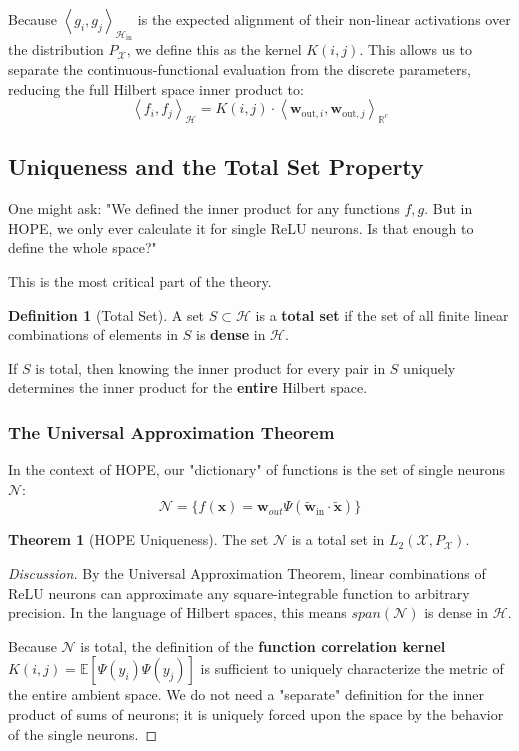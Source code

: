 \documentclass[11pt, a4paper, copyright, gdm]{google}
\newcommand{\inner}[2]{\left\langle#1, #2\right\rangle}
\newcommand{\wVect}{\boldsymbol{w}}
\newcommand{\xVect}{\boldsymbol{x}}
\newcommand{\calH}{\mathcal{H}}
\newcommand{\calN}{\mathcal{N}}
\newcommand{\calX}{\mathcal{X}}
\newcommand{\R}{\mathbb{R}}
\newcommand{\E}{\mathbb{E}}
\theoremstyle{definition}
\newtheorem{definition}{Definition}[section]
\newtheorem{theorem}{Theorem}[section]
\begin{document}
Because $\inner{g_i}{g_j}_{\calH_{\text{in}}}$ is the expected alignment of their non-linear activations over the distribution $P_{\calX}$, we define this as the kernel $K(i,j)$. This allows us to separate the continuous-functional evaluation from the discrete parameters, reducing the full Hilbert space inner product to:
\begin{equation}
    \inner{f_i}{f_j}_{\calH} = K(i,j) \cdot \inner{\wVect_{\text{out},i}}{\wVect_{\text{out},j}}_{\R^c}
\end{equation}

\subsection{Uniqueness and the Total Set Property}

One might ask: "We defined the inner product for any functions $f, g$. But in HOPE, we only ever calculate it for single ReLU neurons. Is that enough to define the whole space?"

This is the most critical part of the theory.

\begin{definition}[Total Set]
A set $S \subset \calH$ is a \textbf{total set} if the set of all finite linear combinations of elements in $S$ is \textbf{dense} in $\calH$.
\end{definition}

If $S$ is total, then knowing the inner product for every pair in $S$ uniquely determines the inner product for the \textbf{entire} Hilbert space. 

\subsubsection{The Universal Approximation Theorem}

In the context of HOPE, our "dictionary" of functions is the set of single neurons $\calN$:
\begin{equation}
    \calN = \{ f(\xVect) = \wVect_{out} \Psi(\tilde{\wVect}_{\text{in}} \cdot \tilde{\xVect}) \}
\end{equation}

\begin{theorem}[HOPE Uniqueness]
The set $\calN$ is a total set in $L_2(\calX, P_{\calX})$.
\end{theorem}

\begin{proof}[Discussion]
By the Universal Approximation Theorem, linear combinations of ReLU neurons can approximate any square-integrable function to arbitrary precision. In the language of Hilbert spaces, this means $span(\calN)$ is dense in $\calH$. 

Because $\calN$ is total, the definition of the \textbf{function correlation kernel} $K(i, j) = \E[\Psi(y_i)\Psi(y_j)]$ is sufficient to uniquely characterize the metric of the entire ambient space. We do not need a "separate" definition for the inner product of sums of neurons; it is uniquely forced upon the space by the behavior of the single neurons.
\end{proof}
\end{document}
